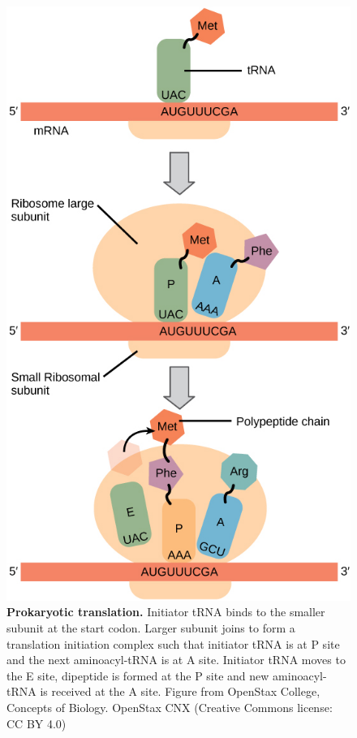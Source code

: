 \begin{figure}[!hbtp]
    \centering
    \includegraphics{chapters/Introduction/Figures/translation.jpg}
    \caption[Prokaryotic translation.]{\textbf{Prokaryotic translation.} Initiator tRNA binds to the smaller subunit at the start codon. Larger subunit joins to form a translation initiation complex such that initiator tRNA is at P site and the next aminoacyl-tRNA is at A site. Initiator tRNA moves to the E site, dipeptide is formed at the P site and new aminoacyl-tRNA is received at the A site. Figure from OpenStax College, Concepts of Biology. OpenStax CNX (Creative Commons license: CC BY 4.0) }%
    \label{fig:prokaryotic_translation}
\end{figure}


